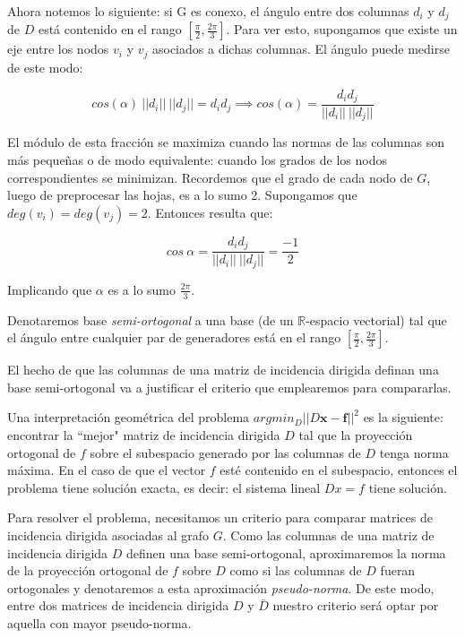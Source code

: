 \documentclass[10pt, a4paper, twocolumn]{article} %
\begin{document}
Ahora notemos lo siguiente: si G es conexo, el ángulo entre dos 
columnas $d_i$ y $d_j$ de $D$ está contenido en el rango 
$[\frac{\pi}{2},\frac{2\pi}{3}]$. Para ver esto, supongamos que existe 
un eje entre los nodos $v_i$ y $v_j$ asociados a dichas columnas. 
El ángulo puede medirse de este modo:

$$cos(\alpha) \ ||d_i|| \ ||d_j||= d_i  d_j \implies cos(\alpha) = 
\frac{d_i d_j}{||d_i|| \ ||d_j||}$$

El módulo de esta fracción se maximiza cuando las normas de las columnas
 son más pequeñas o de modo equivalente: cuando los grados de los nodos 
 correspondientes se minimizan. Recordemos que el grado de cada nodo de 
 $G$, luego de preprocesar las hojas, es a lo sumo 2. Supongamos que  
 $deg(v_i) = deg(v_j) = 2$. Entonces resulta que:

$$cos \ \alpha = \frac{d_i d_j}{||d_i|| \ ||d_j||} = \frac{-1}{2}$$

\smallskip

Implicando que $\alpha$ es a lo sumo $\frac{2\pi}{3}$.

\smallskip

Denotaremos base \textit{semi-ortogonal} a una base (de un 
$\mathbb{R}$-espacio vectorial) tal que el ángulo entre cualquier par de 
generadores está en el rango $[\frac{\pi}{2},\frac{2\pi}{3}]$.

\smallskip

El hecho de que las columnas de una matriz de incidencia dirigida 
definan una base semi-ortogonal va a justificar el criterio que 
emplearemos para compararlas.

\bigskip


Una interpretación geométrica del problema $argmin_D||D \bm x- \bm f
||^2$ es la siguiente: encontrar la ``mejor" matriz de incidencia 
dirigida $D$ tal que la proyección ortogonal de $f$ sobre el subespacio 
generado por las columnas de $D$ tenga norma máxima. En el caso de que 
el vector $f$ esté contenido en el subespacio, entonces el problema 
tiene solución exacta, es decir: el sistema lineal $Dx = f$ tiene 
solución.

\smallskip

Para resolver el problema, necesitamos un criterio para comparar  
matrices de incidencia dirigida asociadas al grafo $G$. Como las 
columnas de una matriz de incidencia dirigida $D$ definen una base 
semi-ortogonal, aproximaremos la norma de la proyección 
ortogonal de $f$ sobre $D$ como si las columnas de $D$ fueran 
ortogonales y denotaremos a esta aproximación \textit{pseudo-norma}.
 De este modo, entre dos matrices de incidencia dirigida $D$ y 
 $\bar{D}$ nuestro criterio será optar por aquella con mayor 
 pseudo-norma. 
\end{document}
